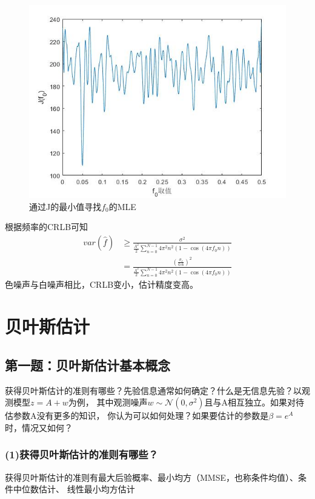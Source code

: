 \documentclass[fontset=windows]{article}
\numberwithin{figure}{section}
\begin{document}
\begin{figure}[H]
	\centering
	\includegraphics[scale=0.5]{fig4.jpg}
	\caption{通过J的最小值寻找\(f_0\)的MLE}
	\label{2.2.4}
\end{figure}

根据频率的CRLB可知
\begin{align*}
	var(\hat{f}) & \geq\frac{\sigma^2}
	{\frac{A^2}{2}\sum_{n=0}^{N-1}4\pi^2n^2(1-\cos(4\pi f_0 n))} \\
	             & =\frac{(\frac{\sigma_e}{0.6})^2}
	{\frac{A^2}{2}\sum_{n=0}^{N-1}4\pi^2n^2(1-\cos(4\pi f_0 n))}
\end{align*}
色噪声与白噪声相比，CRLB变小，估计精度变高。

\section{贝叶斯估计}
\subsection{第一题：贝叶斯估计基本概念}
获得贝叶斯估计的准则有哪些？先验信息通常如何确定？什么是无信息先验？以观测模型\(z=A+w\)为例，
其中观测噪声\(w\sim \mathcal{N}(0,\sigma^2)\)且与A相互独立。如果对待估参数A没有更多的知识，
你认为可以如何处理？如果要估计的参数是\(\beta=e^A\)时，情况又如何？

\subsubsection*{(1)获得贝叶斯估计的准则有哪些？}

获得贝叶斯估计的准则有最大后验概率、最小均方（MMSE，也称条件均值）、条件中位数估计、
线性最小均方估计
\end{document}
